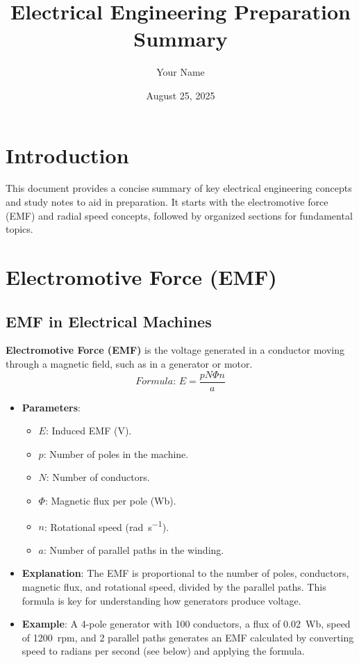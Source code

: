 \documentclass[12pt]{article}
\newcommand{\concept}[1]{\textbf{#1}}
\newcommand{\formula}[1]{\textit{Formula: }#1}
\begin{document}
\title{Electrical Engineering Preparation Summary}
\author{Your Name}
\date{August 25, 2025}
\maketitle

\tableofcontents
\newpage

\section{Introduction}
This document provides a concise summary of key electrical engineering concepts and study notes to aid in preparation. It starts with the electromotive force (EMF) and radial speed concepts, followed by organized sections for fundamental topics.

\section{Electromotive Force (EMF)}
\subsection{EMF in Electrical Machines}
\concept{Electromotive Force (EMF)} is the voltage generated in a conductor moving through a magnetic field, such as in a generator or motor.
\[
\formula{E = \frac{p N \Phi n}{a}}
\]
\begin{itemize}
    \item \textbf{Parameters}:
        \begin{itemize}
            \item \(E\): Induced EMF (\si{\volt}).
            \item \(p\): Number of poles in the machine.
            \item \(N\): Number of conductors.
            \item \(\Phi\): Magnetic flux per pole (\si{\weber}).
            \item \(n\): Rotational speed (\si{\radian\per\second}).
            \item \(a\): Number of parallel paths in the winding.
        \end{itemize}
    \item \textbf{Explanation}: The EMF is proportional to the number of poles, conductors, magnetic flux, and rotational speed, divided by the parallel paths. This formula is key for understanding how generators produce voltage.
    \item \textbf{Example}: A 4-pole generator with 100 conductors, a flux of \SI{0.02}{\weber}, speed of \SI{1200}{rpm}, and 2 parallel paths generates an EMF calculated by converting speed to radians per second (see below) and applying the formula.
\end{itemize}
\end{document}
